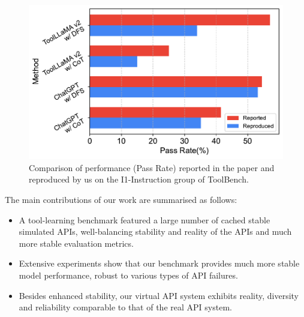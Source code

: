 \begin{figure}[t!]
    \centering
    \includegraphics[width=\linewidth]{figs/real_comparison.pdf}
    \caption{Comparison of performance (Pass Rate) reported in the paper and reproduced by us on the I1-Instruction group of ToolBench.}
    \label{fig:performance_comparison_failure}
\end{figure}
The main contributions of our work are summarised as follows:
\begin{itemize}[noitemsep]
    \item A tool-learning benchmark featured a large number of cached stable simulated APIs, well-balancing stability and reality of the APIs and much more stable evaluation metrics.
    \item Extensive experiments show that our benchmark provides much more stable model performance, robust to various types of API failures.
    \item Besides enhanced stability, our virtual API system exhibits reality, diversity and reliability comparable to that of the real API system.
\end{itemize}


